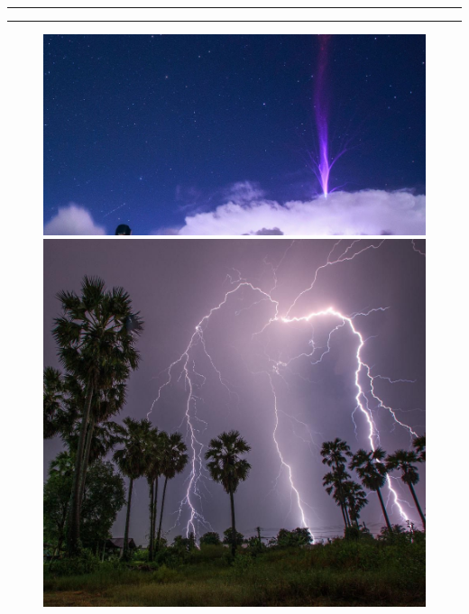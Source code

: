 \documentclass[11pt]{article}
\begin{document}
\begin{enumerate}
\begin{figure}[!thp]
\begin{minipage}[b]{0.354\textwidth}
  \end{minipage}
\end{figure}
\newline
\rule{4.5cm}{0.05cm} \hspace{5.7cm} \rule{3.5cm}{0.05cm}
\bigskip
\begin{figure}[tbh!]
\begin{minipage}[b]{0.5\textwidth}
    \includegraphics[width=\textwidth]{resources/jet.jpg}
    
  \end{minipage}
  \hfill
  \begin{minipage}[b]{0.272\textwidth}
    \includegraphics[width=\textwidth]{resources/blesk.jpg}
   

\end{minipage}
\end{figure}
\end{enumerate}
\end{document}
